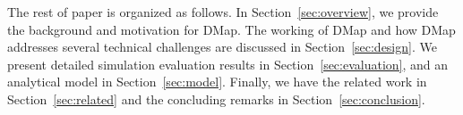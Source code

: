 





The rest of paper is organized as follows. In Section~\ref{sec:overview}, we provide the background and motivation for DMap. The working of DMap and how DMap addresses several technical challenges are discussed in Section~\ref{sec:design}. We present detailed simulation evaluation results in Section~\ref{sec:evaluation}, and an analytical model in Section~\ref{sec:model}. Finally, we have the related work in Section~\ref{sec:related} and the concluding remarks in Section~\ref{sec:conclusion}.





